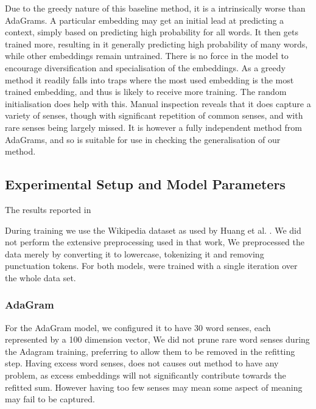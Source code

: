 \documentclass{sig-alternate}
\begin{document}
Due to the greedy nature of this baseline method, it is a intrinsically worse than AdaGrams. A particular embedding may get an initial lead at predicting a context, simply based on predicting high probability for all words. It then gets trained more, resulting in it generally predicting high probability of many words, while other embeddings remain untrained. There is no force in the model to encourage diversification and specialisation of the embeddings. As a greedy method it readily falls into traps where the most used embedding is the most trained embedding, and thus is likely to receive more training. The random initialisation does help with this. Manual inspection reveals that it does capture a variety of senses, though with significant repetition of common senses, and with rare senses being largely missed. It is however a fully independent method from AdaGrams, and so is suitable for use in checking the generalisation of our method.


\subsection{Experimental Setup and Model Parameters}

The results reported in 


During training we use the Wikipedia dataset as used by Huang et al. \cite{Huang2012}.
We did not perform the extensive preprocessing used in that work, 
We preprocessed the data merely by converting it to lowercase, tokenizing it and removing punctuation tokens.
For both models, were trained with a single iteration over the whole data set.


\subsubsection{AdaGram}
For the AdaGram model, we configured it to have 30 word senses, each represented by a 100 dimension vector,
We did not prune rare word senses during the Adagram training, preferring to allow them to be removed in the refitting step.
Having excess word senses, does not causes out method to have any problem, as excess embeddings will not significantly contribute towards the refitted sum.
However having too few senses may mean some aspect of meaning may fail to be captured.


\begin{comment}
\end{comment}
\end{document}
